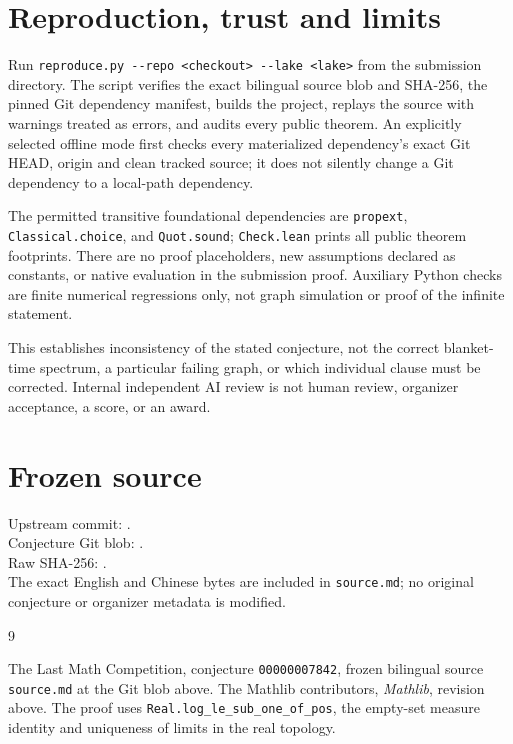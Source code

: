 \documentclass[11pt]{article}
\begin{document}
\section{Reproduction, trust and limits}
Run \verb|reproduce.py --repo <checkout> --lake <lake>| from the submission directory. The script verifies the exact bilingual source blob and SHA-256, the pinned Git dependency manifest, builds the project, replays the source with warnings treated as errors, and audits every public theorem. An explicitly selected offline mode first checks every materialized dependency's exact Git HEAD, origin and clean tracked source; it does not silently change a Git dependency to a local-path dependency.

The permitted transitive foundational dependencies are \texttt{propext}, \texttt{Classical.choice}, and \texttt{Quot.sound}; \texttt{Check.lean} prints all public theorem footprints. There are no proof placeholders, new assumptions declared as constants, or native evaluation in the submission proof. Auxiliary Python checks are finite numerical regressions only, not graph simulation or proof of the infinite statement.

This establishes inconsistency of the stated conjecture, not the correct blanket-time spectrum, a particular failing graph, or which individual clause must be corrected. Internal independent AI review is not human review, organizer acceptance, a score, or an award.

\section*{Frozen source}
Upstream commit: .\\
Conjecture Git blob: .\\
Raw SHA-256: .\\
The exact English and Chinese bytes are included in \texttt{source.md}; no original conjecture or organizer metadata is modified.

\begin{thebibliography}{9}
\raggedright
{} The Last Math Competition, conjecture \texttt{00000007842}, frozen bilingual source \texttt{source.md} at the Git blob above.
 The Mathlib contributors, \emph{Mathlib}, revision above. The proof uses \texttt{Real.log\_le\_sub\_one\_of\_pos}, the empty-set measure identity and uniqueness of limits in the real topology.
\end{thebibliography}
\end{document}
